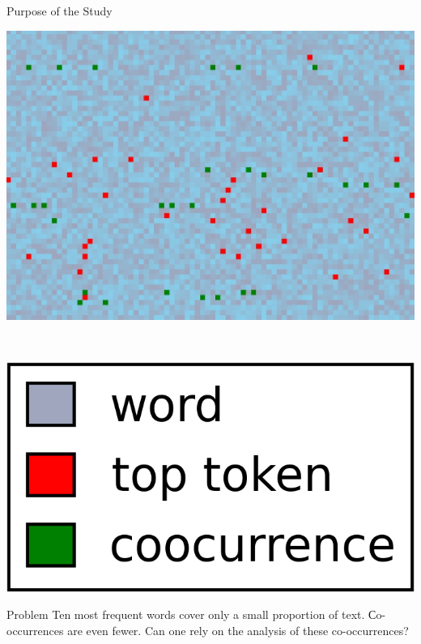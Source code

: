 \documentclass[russian]{beamer}
\begin{document}
\begin{frame}{Purpose of the Study}
  \begin{minipage}{0.70\textwidth}
    \includegraphics[width=\textwidth]{doc11358_topic0.jpg}
  \end{minipage}
  ~
  \begin{minipage}{0.20\textwidth}
    \includegraphics[width=\textwidth]{legend.png}
  \end{minipage}
  \begin{block}{Problem}
    Ten most frequent words cover only a small proportion of text.
    Сo-occurrences are even fewer.
    Can one rely on the analysis of these co-occurrences?
  \end{block}
\end{frame}
\end{document}
